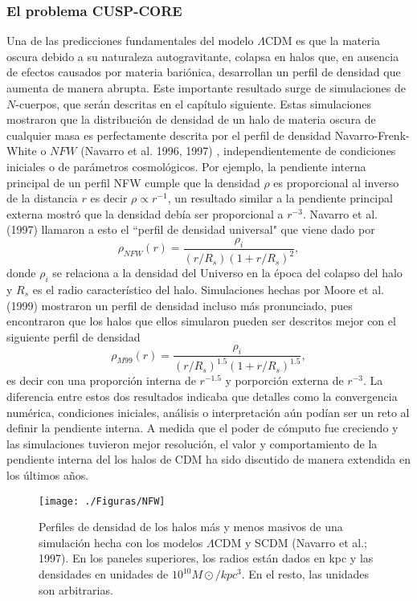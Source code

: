 \documentclass[a4paper,openright,12pt]{book}
\begin{document}
\subsubsection*{El problema CUSP-CORE} 
Una de las predicciones fundamentales del modelo $\Lambda$CDM es que la materia oscura debido a su naturaleza autogravitante, colapsa en halos que, en ausencia de efectos causados por materia bariónica, desarrollan un perfil de densidad que aumenta de manera abrupta. Este importante resultado surge de simulaciones de $N$-cuerpos, que serán descritas en el capítulo siguiente. Estas simulaciones mostraron que la distribución de densidad de un halo de materia oscura de cualquier masa es perfectamente descrita por el perfil de densidad Navarro-Frenk-White o $NFW$ (Navarro et al. 1996, 1997) \cite{b1}, independientemente de condiciones iniciales o de parámetros cosmológicos. Por ejemplo, la pendiente interna principal de un perfil NFW cumple que la densidad $\rho$ es proporcional al inverso de la distancia $r$ es decir $\rho \propto r^{-1}$, un resultado similar a la pendiente principal externa mostró que la densidad debía ser proporcional a $r^{-3}$. Navarro et al. (1997) llamaron a esto el ``perfil de densidad universal"  que viene dado por
\begin{equation}
\rho_{NFW}(r)= \frac{\rho_{i}}{(r/R_{s})(1 + r/R_{s})^{2}},\label{eqn 1.44}
\end{equation}
donde $\rho_{i}$ se relaciona a la densidad del Universo en la época del colapso del halo y $R_{s}$ es el radio característico del halo. Simulaciones hechas por Moore et al. (1999) \cite{Moore 1999} mostraron un perfil de densidad incluso más pronunciado, pues encontraron que los halos que ellos simularon pueden ser descritos mejor con el siguiente perfil de densidad
\begin{equation}
\rho_{M99}(r)= \frac{\rho_{i}}{(r/R_{s})^{1.5}(1 + r/R_{s})^{1.5}},\label{eqn 1.45}
\end{equation} 
es decir con una proporción interna de $r^{-1.5}$ y porporción externa de $r^{-3}$. La diferencia entre estos dos resultados indicaba que detalles como la convergencia numérica, condiciones iniciales, análisis o interpretación aún podían ser un reto al definir la pendiente interna. A medida que el poder de cómputo fue creciendo y las simulaciones tuvieron mejor resolución, el valor y comportamiento de la pendiente interna del los halos de CDM ha sido discutido de manera extendida en los últimos años.
\begin{figure}
\centering
  \texttt{[image: ./Figuras/NFW]}
  \caption{\footnotesize{Perfiles de densidad de los halos más y menos masivos de una simulación hecha con los modelos $\Lambda$CDM y SCDM (Navarro et al.; 1997). En los paneles superiores, los radios están dados en kpc y las densidades en unidades de $10^{10} M\odot / kpc^{3}$. En el resto, las unidades son arbitrarias.}}
  \label{fig 1.7}
\end{figure}
  
\end{document}

